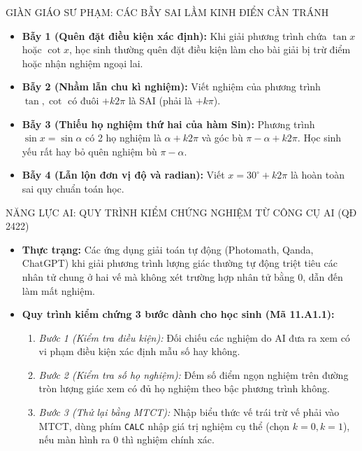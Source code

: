 \documentclass[12pt, a4paper]{article}
\begin{document}
\begin{scaffoldbox}{GIÀN GIÁO SƯ PHẠM: CÁC BẪY SAI LẦM KINH ĐIỂN CẦN TRÁNH}  
\begin{itemize}[leftmargin=0.6cm]  
    \item \textbf{Bẫy 1 (Quên đặt điều kiện xác định):} Khi giải phương trình chứa $\tan x$ hoặc $\cot x$, học sinh thường quên đặt điều kiện làm cho bài giải bị trừ điểm hoặc nhận nghiệm ngoại lai.  
    \item \textbf{Bẫy 2 (Nhầm lẫn chu kì nghiệm):} Viết nghiệm của phương trình $\tan, \cot$ có đuôi $+ k2\pi$ là SAI (phải là $+ k\pi$).  
    \item \textbf{Bẫy 3 (Thiếu họ nghiệm thứ hai của hàm Sin):} Phương trình $\sin x = \sin\alpha$ có 2 họ nghiệm là $\alpha + k2\pi$ và góc bù $\pi - \alpha + k2\pi$. Học sinh yếu rất hay bỏ quên nghiệm bù $\pi - \alpha$.  
    \item \textbf{Bẫy 4 (Lẫn lộn đơn vị độ và radian):} Viết $x = 30^\circ + k2\pi$ là hoàn toàn sai quy chuẩn toán học.  
\end{itemize}  
\end{scaffoldbox}  
  
\begin{aibox}{NĂNG LỰC AI: QUY TRÌNH KIỂM CHỨNG NGHIỆM TỪ CÔNG CỤ AI (QĐ 2422)}  
\begin{itemize}[leftmargin=0.6cm]  
    \item \textbf{Thực trạng:} Các ứng dụng giải toán tự động (Photomath, Qanda, ChatGPT) khi giải phương trình lượng giác thường tự động triệt tiêu các nhân tử chung ở hai vế mà không xét trường hợp nhân tử bằng $0$, dẫn đến làm mất nghiệm.  
    \item \textbf{Quy trình kiểm chứng 3 bước dành cho học sinh (Mã 11.A1.1):}  
    \begin{enumerate}  
        \item \textit{Bước 1 (Kiểm tra điều kiện):} Đối chiếu các nghiệm do AI đưa ra xem có vi phạm điều kiện xác định mẫu số hay không.  
        \item \textit{Bước 2 (Kiểm tra số họ nghiệm):} Đếm số điểm ngọn nghiệm trên đường tròn lượng giác xem có đủ họ nghiệm theo bậc phương trình không.  
        \item \textit{Bước 3 (Thử lại bằng MTCT):} Nhập biểu thức vế trái trừ vế phải vào MTCT, dùng phím \texttt{CALC} nhập giá trị nghiệm cụ thể (chọn $k = 0, k = 1$), nếu màn hình ra $0$ thì nghiệm chính xác.  
    \end{enumerate}  
\end{itemize}  
\end{aibox}  
  
\end{document}
